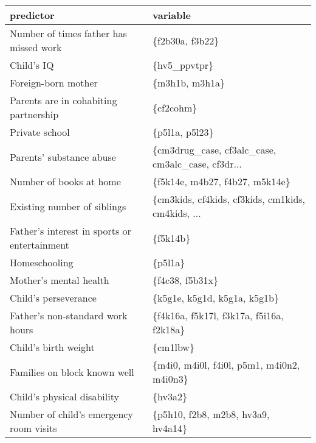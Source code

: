 \begin{tabular}{ll}
\toprule
                                    predictor &                                           variable \\
\midrule
       Number of times father has missed work &                                    \{f2b30a, f3b22\} \\
                                   Child's IQ &                                       \{hv5\_ppvtpr\} \\
                          Foreign-born mother &                                     \{m3h1b, m3h1a\} \\
        Parents are in cohabiting partnership &                                          \{cf2cohm\} \\
                               Private school &                                     \{p5l1a, p5l23\} \\
                     Parents' substance abuse &  \{cm3drug\_case, cf3alc\_case, cm3alc\_case, cf3dr... \\
                      Number of books at home &                     \{f5k14e, m4b27, f4b27, m5k14e\} \\
                  Existing number of siblings &  \{cm3kids, cf4kids, cf3kids, cm1kids, cm4kids, ... \\
 Father's interest in sports or entertainment &                                           \{f5k14b\} \\
                                Homeschooling &                                            \{p5l1a\} \\
                       Mother's mental health &                                    \{f4c38, f5b31x\} \\
                         Child's perseverance &                       \{k5g1e, k5g1d, k5g1a, k5g1b\} \\
             Father's non-standard work hours &           \{f4k16a, f5k17l, f3k17a, f5i16a, f2k18a\} \\
                         Child's birth weight &                                           \{cm1lbw\} \\
                 Families on block known well &         \{m4i0, m4i0l, f4i0l, p5m1, m4i0n2, m4i0n3\} \\
                  Child's physical disability &                                            \{hv3a2\} \\
      Number of child's emergency room visits &                 \{p5h10, f2b8, m2b8, hv3a9, hv4a14\} \\

\end{tabular}
